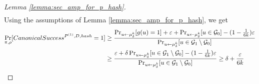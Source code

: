\begin{proof}[Lemma \ref{lemma:sec_amp_for_p_hash}]
\begin{align*}
 \end{align*}
 Using the assumptions of Lemma \ref{lemma:sec_amp_for_p_hash}, we get
 \begin{align}
   \label{eq:proof_final}
   \underset{\pi, \rho}{\Pr}[CanonicalSuccess^{P^{(1)}, D, hash} = 1]
 &\geq \frac{ {\Pr}_{u \leftarrow \mu_{\delta}^{k}}[g(u) = 1] + \varepsilon +
 \Pr_{u \leftarrow \mu_{\delta}^{k}}[u \in \mathcal{G}_0] - (1 - \frac{1}{6k})\varepsilon} {\Pr_{u \leftarrow \mu_{\delta}^{k}}[u \in \mathcal{G}_1 \setminus \mathcal{G}_0]} \notag\\
 &\geq \frac{\varepsilon + \delta\Pr_{u \leftarrow \mu_{\delta}^{k}}[u \in \mathcal{G}_1 \setminus \mathcal{G}_0] - (1 - \frac{1}{6k})\varepsilon}
{\Pr_{u \leftarrow \mu_{\delta}^{k}}[u \in \mathcal{G}_1 \setminus \mathcal{G}_0]} \geq \delta + \frac{\varepsilon}{6k}
\end{align}
\end{proof}

%
